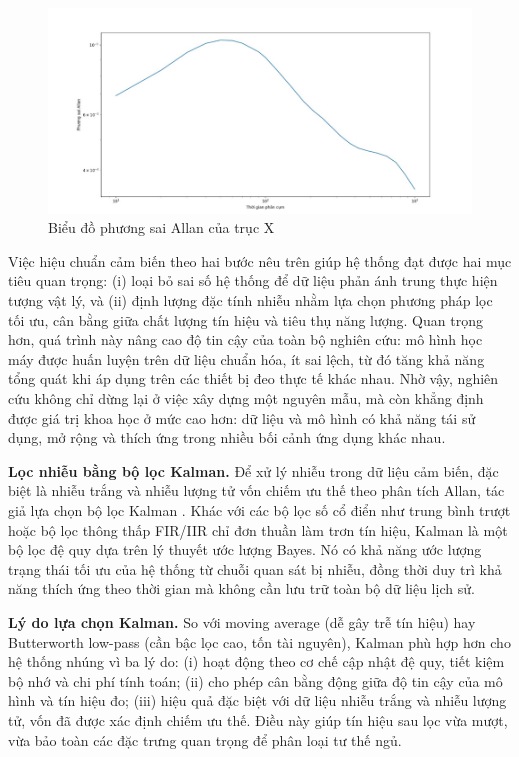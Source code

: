\begin{figure}[htbp]
\centering
\includegraphics[width=\textwidth]{images/allan_real.png}
\caption{Biểu đồ phương sai Allan của trục X}
\label{allan_real}
\end{figure}

Việc hiệu chuẩn cảm biến theo hai bước nêu trên giúp hệ thống đạt được hai mục tiêu quan trọng: (i) loại bỏ sai số hệ thống để dữ liệu phản ánh trung thực hiện tượng vật lý, và (ii) định lượng đặc tính nhiễu nhằm lựa chọn phương pháp lọc tối ưu, cân bằng giữa chất lượng tín hiệu và tiêu thụ năng lượng. Quan trọng hơn, quá trình này nâng cao độ tin cậy của toàn bộ nghiên cứu: mô hình học máy được huấn luyện trên dữ liệu chuẩn hóa, ít sai lệch, từ đó tăng khả năng tổng quát khi áp dụng trên các thiết bị đeo thực tế khác nhau. Nhờ vậy, nghiên cứu không chỉ dừng lại ở việc xây dựng một nguyên mẫu, mà còn khẳng định được giá trị khoa học ở mức cao hơn: dữ liệu và mô hình có khả năng tái sử dụng, mở rộng và thích ứng trong nhiều bối cảnh ứng dụng khác nhau.

\textbf{Lọc nhiễu bằng bộ lọc Kalman.}
Để xử lý nhiễu trong dữ liệu cảm biến, đặc biệt là nhiễu trắng và nhiễu lượng tử vốn chiếm ưu thế theo phân tích Allan, tác giả lựa chọn bộ lọc Kalman \cite{kalman}. Khác với các bộ lọc số cổ điển như trung bình trượt hoặc bộ lọc thông thấp FIR/IIR chỉ đơn thuần làm trơn tín hiệu, Kalman là một bộ lọc đệ quy dựa trên lý thuyết ước lượng Bayes. Nó có khả năng ước lượng trạng thái tối ưu của hệ thống từ chuỗi quan sát bị nhiễu, đồng thời duy trì khả năng thích ứng theo thời gian mà không cần lưu trữ toàn bộ dữ liệu lịch sử.

\textbf{Lý do lựa chọn Kalman.} So với moving average (dễ gây trễ tín hiệu) hay Butterworth low-pass (cần bậc lọc cao, tốn tài nguyên), Kalman phù hợp hơn cho hệ thống nhúng vì ba lý do: (i) hoạt động theo cơ chế cập nhật đệ quy, tiết kiệm bộ nhớ và chi phí tính toán; (ii) cho phép cân bằng động giữa độ tin cậy của mô hình và tín hiệu đo; (iii) hiệu quả đặc biệt với dữ liệu nhiễu trắng và nhiễu lượng tử, vốn đã được xác định chiếm ưu thế. Điều này giúp tín hiệu sau lọc vừa mượt, vừa bảo toàn các đặc trưng quan trọng để phân loại tư thế ngủ.

